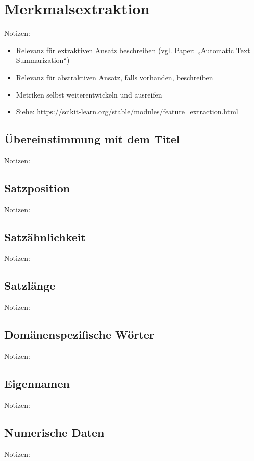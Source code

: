 \section{Merkmalsextraktion}
Notizen:
\begin{itemize}
	\item Relevanz für extraktiven Ansatz beschreiben (vgl. Paper: „Automatic Text Summarization“)
	\item Relevanz für abstraktiven Ansatz, falls vorhanden, beschreiben
	\item Metriken selbst weiterentwickeln und ausreifen
	\item Siehe: \url{https://scikit-learn.org/stable/modules/feature_extraction.html}
\end{itemize}


\subsection{Übereinstimmung mit dem Titel}
Notizen:


\subsection{Satzposition}
Notizen:


\subsection{Satzähnlichkeit}
Notizen:


\subsection{Satzlänge}
Notizen:


\subsection{Domänenspezifische Wörter}
Notizen:


\subsection{Eigennamen}
Notizen:


\subsection{Numerische Daten}
Notizen:
